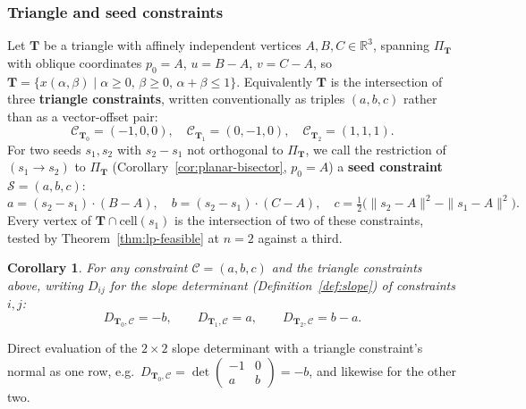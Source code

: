 \documentclass[12pt]{article}
\makeatletter
\newtheorem{corollary}[theorem]{Corollary}
\theoremstyle{definition}
\theoremstyle{remark}
\renewenvironment{proof}[1][\proofname]{\par
  \pushQED{\qed}%
  \normalfont \footnotesize \topsep6\p@\@plus6\p@\relax
  \list{}{\leftmargin=2em
          \settowidth{\itemindent}{\itshape#1}%
          \labelwidth=\itemindent
          \parsep=0pt \listparindent=\parindent 
  }
  \item[\hskip\labelsep
        \itshape
    #1\@addpunct{.}]\ignorespaces
}{%
  \popQED\endlist\@endpefalse
}
\makeatother
\begin{document}
\subsubsection*{Triangle and seed constraints}

Let $\mathbf T$ be a triangle with affinely independent vertices $A,B,C \in
\mathbb{R}^3$, spanning $\Pi_{\mathbf T}$ with oblique coordinates $p_0=A$,
$u=B-A$, $v=C-A$, so $\mathbf T = \{x(\alpha,\beta)\mid \alpha\ge0,\,\beta\ge0,\,
\alpha+\beta\le1\}$. Equivalently $\mathbf T$ is the intersection of three
\textbf{triangle constraints}, written conventionally as triples $(a,b,c)$
rather than as a vector-offset pair:
\begin{equation*}
    \mathcal C_{\mathbf T_0} = (-1,0,0), \quad \mathcal C_{\mathbf T_1} = (0,-1,0), \quad \mathcal C_{\mathbf T_2} = (1,1,1).
\end{equation*}
For two seeds $s_1,s_2$ with $s_2-s_1$ not orthogonal to $\Pi_{\mathbf T}$, we
call the restriction of $(s_1\!\to\!s_2)$ to $\Pi_{\mathbf T}$ (Corollary~\ref{cor:planar-bisector},
$p_0=A$) a \textbf{seed constraint} $\mathcal S=(a,b,c)$:
\begin{equation*}
    a = (s_2-s_1)\cdot(B-A), \quad b = (s_2-s_1)\cdot(C-A), \quad
    c = \tfrac12\big(\|s_2-A\|^2-\|s_1-A\|^2\big).
\end{equation*}
Every vertex of $\mathbf T \cap \mathrm{cell}(s_1)$ is the intersection of
two of these constraints, tested by Theorem~\ref{thm:lp-feasible} at $n=2$
against a third.

\begin{corollary}\label{cor:D-tri}
For any constraint $\mathcal C=(a,b,c)$ and the triangle constraints above,
writing $D_{ij}$ for the slope determinant (Definition~\ref{def:slope}) of
constraints $i,j$:
\begin{equation*}
    D_{\mathbf T_0,\mathcal C} = -b, \qquad D_{\mathbf T_1,\mathcal C} = a, \qquad D_{\mathbf T_2,\mathcal C} = b-a.
\end{equation*}
\end{corollary}
\begin{proof}
Direct evaluation of the $2\times2$ slope determinant with a triangle
constraint's normal as one row, e.g.\ $D_{\mathbf T_0,\mathcal C} =
\det\begin{pmatrix}-1&0\\a&b\end{pmatrix} = -b$, and likewise for the other
two.
\end{proof}
\end{document}
